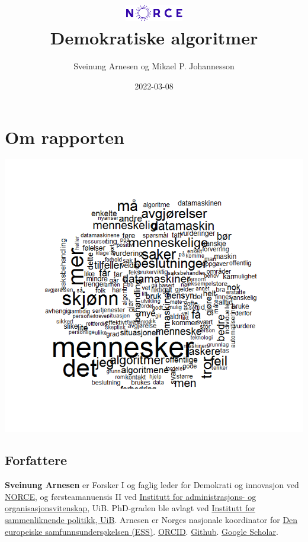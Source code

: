 \documentclass[
]{book}
\title{\includegraphics[width=1in,height=\textheight]{norce_logo.png}\\
Demokratiske algoritmer}
\author{Sveinung Arnesen og Mikael P. Johannesson}
\date{2022-03-08}
\begin{document}
\maketitle

{
\setcounter{tocdepth}{1}
\tableofcontents
}
\hypertarget{om}{%
\chapter{Om rapporten}\label{om}}

\includegraphics{figs/png/nav_ordsky.png}

\hypertarget{forfattere}{%
\section{Forfattere}\label{forfattere}}

\textbf{Sveinung Arnesen} er Forsker I og faglig leder for Demokrati og innovasjon ved \href{https://www.norceresearch.no/personer/sveinung-arnesen}{NORCE}, og førsteamanuensis II ved \href{https://www.uib.no/personer/Sveinung.Arnesen}{Institutt for administrasjons- og organisasjonsvitenskap}, UiB.
PhD-graden ble avlagt ved \href{https://www.uib.no/sampol}{Institutt for sammenliknende politikk, UiB}.
Arnesen er Norges nasjonale koordinator for \href{europeansocialsurvey.org}{Den europeiske samfunnsundersøkelsen (ESS)}. \href{https://orcid.org/0000-0002-2825-0664}{ORCID}. \href{https://github.com/SveinungA/}{Github}. \href{https://scholar.google.com/citations?user=xz8JwjAAAAAJ\&hl=no\&oi=ao}{Google Scholar}.
\end{document}
